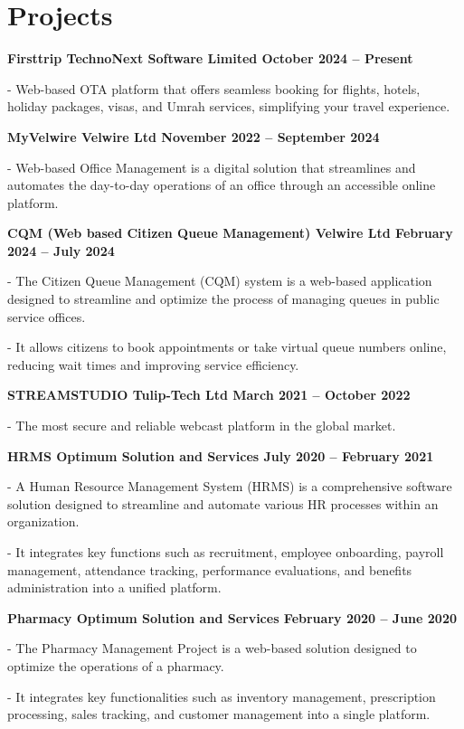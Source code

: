 \documentclass[a4paper,10pt]{article}
\newcommand{\cventry}[2]{%
  \par\vspace{0.7em}%
  \noindent\textbf{#1}\par
  \nopagebreak\vspace{0.2em}%
  \noindent\color{bodygray}#2\par
}
\begin{document}
\section{Projects}

\cventry{Firsttrip \textbar{} TechnoNext Software Limited \textbar{} October 2024 -- Present}{%
- Web-based OTA platform that offers seamless booking for flights, hotels, holiday
packages, visas, and Umrah services, simplifying your travel experience.}

\cventry{MyVelwire \textbar{} Velwire Ltd \textbar{} November 2022 -- September 2024}{%
- Web-based Office Management is a digital solution that streamlines and automates the
day-to-day operations of an office through an accessible online platform.}

\cventry{CQM (Web based Citizen Queue Management) \textbar{} Velwire Ltd \textbar{} February 2024 -- July 2024}{%
- The Citizen Queue Management (CQM) system is a web-based application designed to
streamline and optimize the process of managing queues in public service offices.\par
\vspace{0.25em}
- It allows citizens to book appointments or take virtual queue numbers online, reducing
wait times and improving service efficiency.}

\cventry{STREAMSTUDIO \textbar{} Tulip-Tech Ltd \textbar{} March 2021 -- October 2022}{%
- The most secure and reliable webcast platform in the global market.}

\cventry{HRMS \textbar{} Optimum Solution and Services \textbar{} July 2020 -- February 2021}{%
- A Human Resource Management System (HRMS) is a comprehensive software solution designed
to streamline and automate various HR processes within an organization.\par
\vspace{0.25em}
- It integrates key functions such as recruitment, employee onboarding, payroll management,
attendance tracking, performance evaluations, and benefits administration into a unified
platform.}

\cventry{Pharmacy \textbar{} Optimum Solution and Services \textbar{} February 2020 -- June 2020}{%
- The Pharmacy Management Project is a web-based solution designed to optimize the
operations of a pharmacy.\par
\vspace{0.25em}
- It integrates key functionalities such as inventory management, prescription processing,
sales tracking, and customer management into a single platform.}
\end{document}
